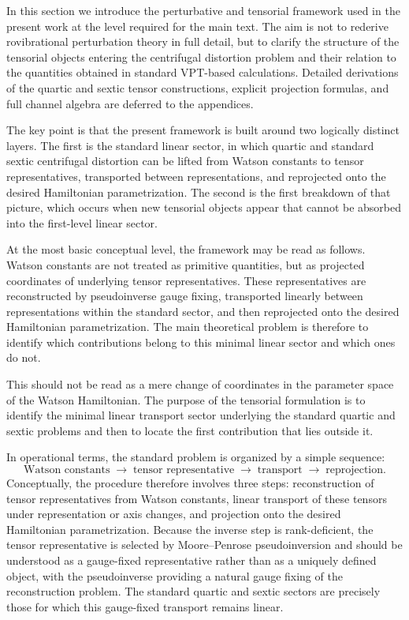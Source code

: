 \documentclass[aip,jcp,reprint,floatfix]{revtex4-2}
\begin{document}
In this section we introduce the perturbative and tensorial framework
used in the present work at the level required for the main text.
The aim is not to rederive rovibrational perturbation theory in full
detail, but to clarify the structure of the tensorial objects entering
the centrifugal distortion problem and their relation to the
quantities obtained in standard VPT-based calculations. Detailed
derivations of the quartic and sextic tensor constructions, explicit
projection formulas, and full channel algebra are deferred to the
appendices.

The key point is that the present framework is built around two
logically distinct layers. The first is the standard linear sector, in
which quartic and standard sextic centrifugal distortion can be lifted
from Watson constants to tensor representatives, transported between
representations, and reprojected onto the desired Hamiltonian
parametrization. The second is the first breakdown of that picture,
which occurs when new tensorial objects appear that cannot be absorbed
into the first-level linear sector.

At the most basic conceptual level, the framework may be read as
follows. Watson constants are not treated as primitive quantities, but
as projected coordinates of underlying tensor representatives. These
representatives are reconstructed by pseudoinverse gauge fixing,
transported linearly between representations within the standard
sector, and then reprojected onto the desired Hamiltonian
parametrization. The main theoretical problem is therefore to identify
which contributions belong to this minimal linear sector and which ones
do not.

This should not be read as a mere change of coordinates in
the parameter space of the Watson Hamiltonian. The purpose of the
tensorial formulation is to identify the minimal linear transport
sector underlying the standard quartic and sextic problems and then to
locate the first contribution that lies outside it.

In operational terms, the standard problem is organized by a simple
sequence:
\begin{equation}
\text{Watson constants}
\;\longrightarrow\;
\text{tensor representative}
\;\longrightarrow\;
\text{transport}
\;\longrightarrow\;
\text{reprojection}.
\end{equation}
Conceptually, the procedure therefore involves three steps:
reconstruction of tensor representatives from Watson constants, linear
transport of these tensors under representation or axis changes, and
projection onto the desired Hamiltonian parametrization.
Because the inverse step is rank-deficient, the tensor representative
is selected by Moore--Penrose pseudoinversion and should be understood
as a gauge-fixed representative rather than as a uniquely defined
object, with the pseudoinverse providing a natural gauge fixing of the
reconstruction problem.\cite{Penrose1955} The standard quartic and sextic sectors are precisely those for
which this gauge-fixed transport remains linear.
\end{document}
